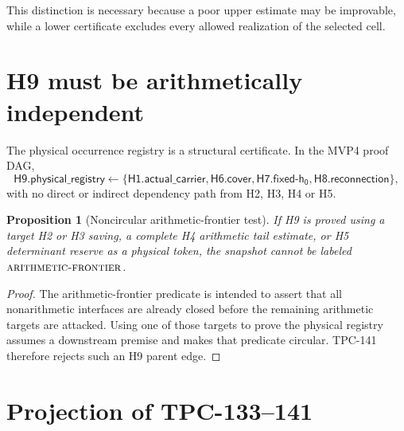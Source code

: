 \documentclass[11pt]{article}
\newtheorem{proposition}[theorem]{Proposition}
\theoremstyle{definition}
\theoremstyle{remark}
\newcommand{\AF}{\textnormal{\textsc{arithmetic-frontier}}}
\begin{document}
This distinction is necessary because a poor upper estimate may be
improvable, while a lower certificate excludes every allowed
realization of the selected cell.

\section{H9 must be arithmetically independent}

The physical occurrence registry is a structural certificate.  In
the MVP4 proof DAG,
\[
\mathsf{H9.physical\_registry}
\longleftarrow
\{\mathsf{H1.actual\_carrier},\mathsf{H6.cover},
\mathsf{H7.fixed\mbox{-}h_0},\mathsf{H8.reconnection}\},
\]
with no direct or indirect dependency path from H2, H3, H4 or H5.

\begin{proposition}[Noncircular arithmetic-frontier test]
\label{prop:h9}
If H9 is proved using a target H2 or H3 saving, a complete H4
arithmetic tail estimate, or H5 determinant reserve as a physical
token, the snapshot cannot be labeled \(\AF\).
\end{proposition}

\begin{proof}
The arithmetic-frontier predicate is intended to assert that all
nonarithmetic interfaces are already closed before the remaining
arithmetic targets are attacked.  Using one of those targets to prove
the physical registry assumes a downstream premise and makes that
predicate circular.  TPC-141 therefore rejects such an H9 parent
edge.
\end{proof}

\section{Projection of TPC-133--141}
\end{document}
